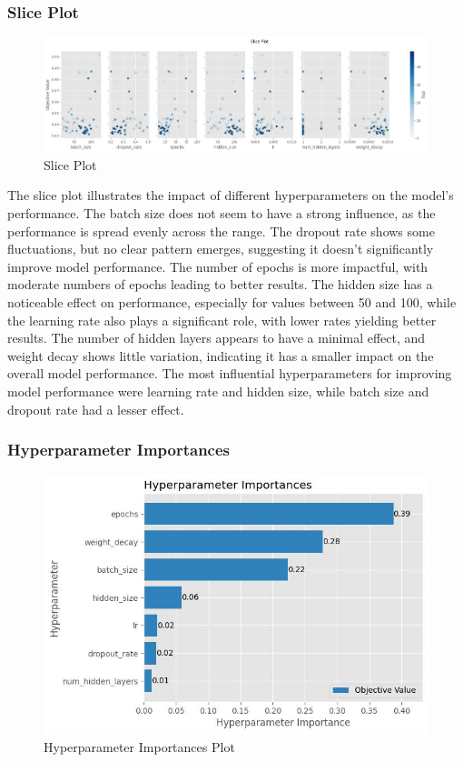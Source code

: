 \subsubsection{Slice Plot}

\begin{figure}[hbt!]
    \centering
    \includegraphics[width=1\linewidth]{Images/5.6.2.a.jpg}
    \caption{Slice Plot}
    \label{fig:enter-label}
\end{figure}

The slice plot illustrates the impact of different hyperparameters on the model's performance. The batch size does not seem to have a strong influence, as the performance is spread evenly across the range. The dropout rate shows some fluctuations, but no clear pattern emerges, suggesting it doesn’t significantly improve model performance. The number of epochs is more impactful, with moderate numbers of epochs leading to better results. The hidden size has a noticeable effect on performance, especially for values between 50 and 100, while the learning rate also plays a significant role, with lower rates yielding better results. The number of hidden layers appears to have a minimal effect, and weight decay shows little variation, indicating it has a smaller impact on the overall model performance. The most influential hyperparameters for improving model performance were learning rate and hidden size, while batch size and dropout rate had a lesser effect.

\subsubsection{Hyperparameter Importances}

\begin{figure}[hbt!]
    \centering
    \includegraphics[width=1\linewidth]{Images/5.6.3.a.jpg}
    \caption{Hyperparameter Importances Plot}
    \label{fig:enter-label}
\end{figure}

